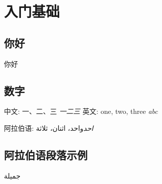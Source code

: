 \chapter{入门基础}
\section{你好}
你好

\section{数字}
中文: 一、二、三 \emph{一二三}
英文: one, two, three \emph{abc}

阿拉伯语: \textarabic{ \emph{ احد}واحد، اثنان، ثلاثة }

\section{阿拉伯语段落示例}
\begin{Arabic}
    جميلة 
\end{Arabic}